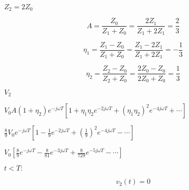 {\newpage\clearpage
{}%
$Z_2=2Z_0$%
\lthtmlinlinemathZ
\lthtmlcheckvsize\clearpage}

{\newpage\clearpage
{}%
\begin{displaymath} A=\frac{Z_0}{Z_1+Z_0}=\frac{2Z_1}{Z_1+2Z_1}=\frac{2}{3} \end{displaymath}%
\lthtmldisplayZ
\lthtmlcheckvsize\clearpage}

{\newpage\clearpage
{}%
\begin{displaymath} \eta_1=\frac{Z_1-Z_0}{Z_1+Z_0}=\frac{Z_1-2Z_1}{Z_1+2Z_1}=-\frac{1}{3} \end{displaymath}%
\lthtmldisplayZ
\lthtmlcheckvsize\clearpage}

{\newpage\clearpage
{}%
\begin{displaymath} \eta_2=\frac{Z_2-Z_0}{Z_2+Z_0}=\frac{2Z_0-Z_0}{2Z_0+Z_0}=\frac{1}{3}  \end{displaymath}%
\lthtmldisplayZ
\lthtmlcheckvsize\clearpage}

{\newpage\clearpage
{}%
$\displaystyle V_2$%
\lthtmlindisplaymathZ
\lthtmlcheckvsize\clearpage}

{\newpage\clearpage
{}%
$\displaystyle V_0A(1+\eta_2)e^{-j\omega T}\left[1+\eta_1\eta_2 e^{-2j\omega T}
    +(\eta_1\eta_2)^2 e^{-4j\omega T}+\cdots \right]$%
\lthtmlindisplaymathZ
\lthtmlcheckvsize\clearpage}

{\newpage\clearpage
{}%
$\displaystyle \frac{8}{9}V_0 e^{-j\omega T}\left[1-\frac{1}{9} e^{-2j\omega T}
    +\left(\frac{1}{9}\right)^2 e^{-4j\omega T}-\cdots \right]$%
\lthtmlindisplaymathZ
\lthtmlcheckvsize\clearpage}

{\newpage\clearpage
{}%
$\displaystyle V_0\left[ \frac{8}{9} e^{-j\omega T}-\frac{8}{81}e^{-3j\omega T}
    +\frac{8}{729}e^{-5j\omega T}-\cdots \right]$%
\lthtmlindisplaymathZ
\lthtmlcheckvsize\clearpage}

{\newpage\clearpage
{}%
$t<T:$%
\lthtmlinlinemathZ
\lthtmlcheckvsize\clearpage}

{\newpage\clearpage
{}%
\begin{displaymath} v_2(t)=0 \end{displaymath}%
\lthtmldisplayZ
\lthtmlcheckvsize\clearpage}

